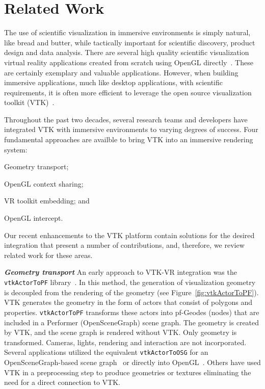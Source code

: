 \section{Related Work}

The use of scientific visualization in immersive environments is simply natural, like bread and butter, while tactically important for scientific discovery, product design and data analysis.
There are several high quality scientific visualization virtual reality applications created from scratch using OpenGL directly~\cite{Billen:2008, LaViola:2007, Schulze:2001, Rantzau:1998}.
These are certainly exemplary and valuable applications.
However, when building immersive applications, much like desktop applications, with scientific requirements, it is often more efficient to leverage the open source visualization toolkit (VTK)~\cite{Schroeder:2004}.

Throughout the past two decades, several research teams and developers have integrated VTK with immersive environments to varying degrees of success.
Four fundamental approaches are availble to bring VTK into an
immersive rendering system:

\begin{compactitem}
\item Geometry transport;
\item OpenGL context sharing;
\item VR toolkit embedding; and
\item OpenGL intercept.

\end{compactitem}

Our recent enhancements to the VTK platform contain solutions for the desired integration that present a number of contributions, and, therefore, we review related work for these areas.

\textbf{\textit{Geometry transport}}
An early approach to VTK-VR integration was the \texttt{vtkActorToPF} library~\cite{Leigh98limbo/vtk}.
In this method, the generation of visualization geometry is decoupled from
the rendering of the geometry (see Figure~\ref{fig:vtkActorToPF}). 
VTK generates the geometry in the form of actors that consist of polygons and properties.
\texttt{vtkActorToPF} transforms these actors into pf-Geodes (nodes) that are included in a Performer (OpenSceneGraph) scene graph. The geometry is created by VTK, and the scene graph is rendered without VTK. Only geometry is transformed. Cameras, lights, rendering and interaction are not incorporated. Several applications utilized the equivalent \texttt{vtkActorToOSG} for an OpenSceneGraph-based scene graph~\cite{VE-Suite:2016} or directly into OpenGL~\cite{Ohno:2006}. Others have used VTK in a preprocessing step to produce geometries or textures eliminating the need for a direct connection to VTK\cite{Bivins:2005}.

